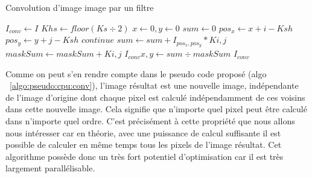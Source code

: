 	\begin{algorithm}[H]
		\caption{Convolution d'image image par un filtre}
		\begin{algorithmic}
			\State $I_{conv} \gets I$
			\State $Khs \gets floor(Ks \div 2)$
			\State $x \gets 0, y \gets 0$
			\State $sum \gets 0$
						\State ${pos_x \gets x + i - Ksh}$ 
						\State ${pos_y \gets y + j - Ksh}$ 
						 
							\State $continue$
						\EndIf
						\State $sum \gets sum + I_{pos_x, pos_y} * K{i, j}$ 
						\State $maskSum \gets maskSum + K{i, j}$
						\EndFor
					\EndFor
					\State $I_{conv}{x, y} \gets sum \div maskSum$ 
				\EndFor
			\EndFor
			\State \Return $I_{conv}$ 
			\EndProcedure
		\end{algorithmic}
		\label{algo:pseudo:cpu:conv}
	\end{algorithm}

Comme on peut s'en rendre compte dans le pseudo code proposé (algo ~\ref{algo:pseudo:cpu:conv}), l'image résultat est une nouvelle image, indépendante de l'image d'origine dont chaque pixel est calculé indépendamment de ces voisins dans cette nouvelle image. Cela signifie que n'importe quel pixel peut être calculé dans n'importe quel ordre. C'est précisément à cette propriété que nous allons nous intéresser car en théorie, avec une puissance de calcul suffisante il est possible de calculer en même temps tous les pixels de l'image résultat. Cet algorithme possède donc un très fort potentiel d'optimisation car il est très largement parallélisable.



